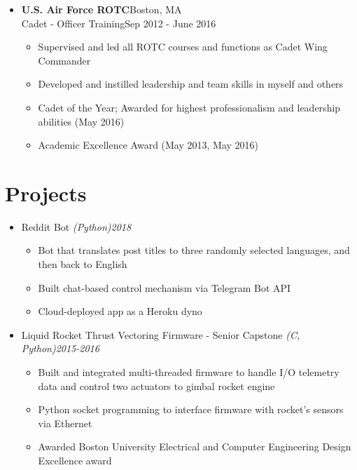 \documentclass{article}
\begin{document}
\begin{itemize}
    \item \textbf{U.S. Air Force ROTC}\hfill Boston, MA\\Cadet - Officer Training\hfill Sep 2012 - June 2016
    \vspace{-\topsep} \vspace{0.2em}
    \begin{itemize}
        \itemsep0em
        \item Supervised and led all ROTC courses and functions as Cadet Wing Commander
        \item Developed and instilled leadership and team skills in myself and others
        \item Cadet of the Year; Awarded for highest professionalism and leadership abilities (May 2016)
        \item Academic Excellence Award (May 2013, May 2016)
    \end{itemize} \end{itemize} 


\section{Projects} 
\begin{itemize}
    \itemsep0.2em
    \item Reddit Bot \emph{(Python)}\hfill \emph{2018}
    \vspace{-\topsep} \vspace{0.2em}
    \begin{itemize}
        \itemsep0em
        \item Bot that translates post titles to three randomly selected languages, and then back to English
        \item Built chat-based control mechanism via Telegram Bot API
        \item Cloud-deployed app as a Heroku dyno
    \end{itemize}
    
    \item Liquid Rocket Thrust Vectoring Firmware - Senior Capstone \emph{(C, Python)}\hfill \emph{2015-2016}
    \vspace{-\topsep} \vspace{0.2em}
    \begin{itemize}
        \itemsep0em
        \item Built and integrated multi-threaded firmware to handle I/O telemetry data and control two actuators to gimbal rocket engine
        \item Python socket programming to interface firmware with rocket’s sensors via Ethernet
        \item Awarded Boston University Electrical and Computer Engineering Design Excellence award
    \end{itemize} \end{itemize} 

\end{document}
